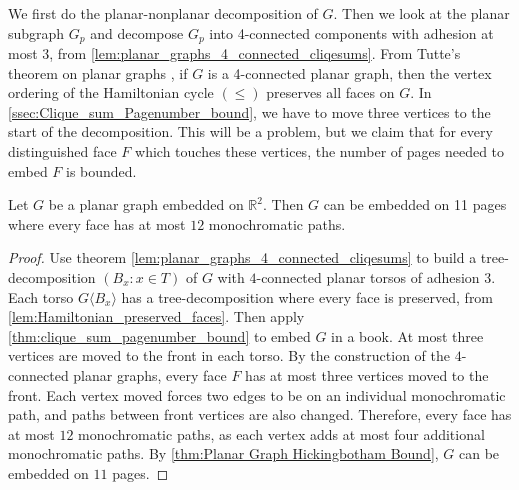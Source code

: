 We first do the planar-nonplanar decomposition of \(G\).
Then we look at the planar subgraph \(G_p\) and decompose \(G_p\) into 4-connected components with adhesion at most 3, from \cref{lem:planar_graphs_4_connected_cliqesums}.
From Tutte's theorem on planar graphs \cite{tutteTheoremPlanarGraphs1956}, if \(G\) is a 4-connected planar graph, then the vertex ordering of the Hamiltonian cycle \((\leq)\) preserves all faces on \(G\).
In \cref{ssec:Clique_sum_Pagenumber_bound}, we have to move three vertices to the start of the decomposition. This will be a problem, but we claim that for every distinguished face \(F\) which touches these vertices, the number of pages needed to embed \(F\) is bounded.


\begin{theorem}\label{thm:embedded_graph}
	Let \( G \) be a planar graph embedded on $\mathbb{R}^2$. Then $G$ can be embedded on 11 pages where every face has at most $12$ monochromatic paths. 
\end{theorem}

\begin{proof}
	Use theorem \cref{lem:planar_graphs_4_connected_cliqesums} to build a tree-decomposition $(B_x : x \in T)$ of $G$ with $4$-connected planar torsos of adhesion 3. Each torso $G \langle B_x \rangle$ has a tree-decomposition where every face is preserved, from \cref{lem:Hamiltonian_preserved_faces}. Then apply \cref{thm:clique_sum_pagenumber_bound} to embed $G$ in a book. At most three vertices are moved to the front in each torso. By the construction of the $4$-connected planar graphs, every face $F$ has at most three vertices moved to the front. Each vertex moved forces two edges to be on an individual monochromatic path, and paths between front vertices are also changed. Therefore, every face has at most $12$ monochromatic paths, as each vertex adds at most four additional monochromatic paths. By \cref{thm:Planar Graph Hickingbotham Bound}, $G$ can be embedded on $11$ pages.
\end{proof}